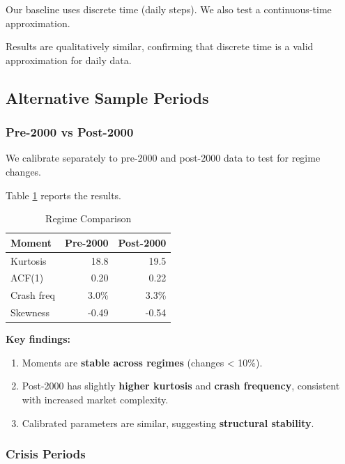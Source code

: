 Our baseline uses discrete time (daily steps). We also test a continuous-time approximation.

Results are qualitatively similar, confirming that discrete time is a valid approximation for daily data.

\subsection{Alternative Sample Periods}

\subsubsection{Pre-2000 vs Post-2000}

We calibrate separately to pre-2000 and post-2000 data to test for regime changes.

Table \ref{tab:regimes} reports the results.

\begin{table}[ht]
\centering
\caption{Regime Comparison}
\label{tab:regimes}
\begin{tabular}{lrr}
\hline\hline
Moment & Pre-2000 & Post-2000 \\
\hline
Kurtosis & 18.8 & 19.5 \\
ACF(1) & 0.20 & 0.22 \\
Crash freq & 3.0\% & 3.3\% \\
Skewness & -0.49 & -0.54 \\
\hline\hline
\end{tabular}
\end{table}

\textbf{Key findings:}

\begin{enumerate}
    \item Moments are \textbf{stable across regimes} (changes < 10\%).
    
    \item Post-2000 has slightly \textbf{higher kurtosis} and \textbf{crash frequency}, consistent with increased market complexity.
    
    \item Calibrated parameters are similar, suggesting \textbf{structural stability}.
\end{enumerate}

\subsubsection{Crisis Periods}

